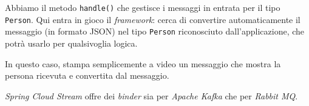 Abbiamo il metodo \texttt{handle()} che gestisce i messaggi in entrata per il tipo \texttt{Person}.
Qui entra in gioco il \textit{framework}: cerca di convertire automaticamente il messaggio (in formato JSON) nel tipo \texttt{Person} riconosciuto dall'applicazione, che potrà usarlo per qualsivoglia logica.

In questo caso, stampa semplicemente a video un messaggio che mostra la persona ricevuta e convertita dal messaggio.

\bigskip

\textit{Spring Cloud Stream} offre dei \textit{binder} sia per \textit{Apache Kafka} che per \textit{Rabbit MQ}.